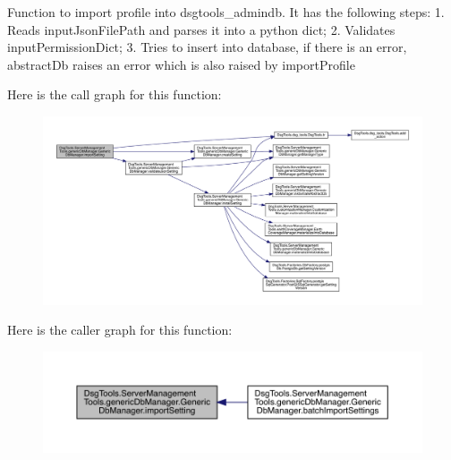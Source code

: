 \begin{DoxyVerb}Function to import profile into dsgtools_admindb. It has the following steps:
1. Reads inputJsonFilePath and parses it into a python dict;
2. Validates inputPermissionDict;
3. Tries to insert into database, if there is an error, abstractDb raises an error which is also raised by importProfile
\end{DoxyVerb}
 Here is the call graph for this function\+:
\nopagebreak
\begin{figure}[H]
\begin{center}
\leavevmode
\includegraphics[width=350pt]{class_dsg_tools_1_1_server_management_tools_1_1generic_db_manager_1_1_generic_db_manager_af254decbd6cb86cdcf93e681df9bcb4f_cgraph}
\end{center}
\end{figure}
Here is the caller graph for this function\+:
\nopagebreak
\begin{figure}[H]
\begin{center}
\leavevmode
\includegraphics[width=350pt]{class_dsg_tools_1_1_server_management_tools_1_1generic_db_manager_1_1_generic_db_manager_af254decbd6cb86cdcf93e681df9bcb4f_icgraph}
\end{center}
\end{figure}
\mbox{\label{class_dsg_tools_1_1_server_management_tools_1_1generic_db_manager_1_1_generic_db_manager_a6221e5ae58ee912401f15a9c6708bb25}} 
